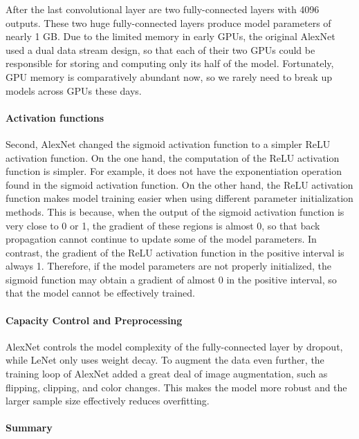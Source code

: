 After the last convolutional layer are two fully-connected layers with 4096 outputs. These two huge fully-connected layers produce model parameters of nearly 1 GB. Due to the limited memory in early GPUs, the original AlexNet used a dual data stream design,
so that each of their two GPUs could be responsible for storing and computing only its half of the model. Fortunately, GPU memory is comparatively abundant now, so we rarely need to break up models across GPUs these days.

\paragraph{Activation functions}

Second, AlexNet changed the sigmoid activation function to a simpler ReLU activation function. On the one hand, the computation of the ReLU activation function is simpler. For example, it does not have the exponentiation operation found in the sigmoid activation function. On the other hand, the ReLU activation function makes model training easier when using different parameter initialization methods. This is because, when the output of the sigmoid activation function is very close to 0 or 1, the gradient of these regions is almost 0, so that back propagation cannot continue to update some of the model parameters. In contrast, the gradient of the ReLU activation function in the positive interval is always 1. Therefore, if the model parameters are not properly initialized, the sigmoid function may obtain a gradient of almost 0 in the positive interval, so that the model cannot be effectively trained.

\paragraph{Capacity Control and Preprocessing}

AlexNet controls the model complexity of the fully-connected layer by dropout, while LeNet only uses weight decay. To augment the data even further, the training loop of AlexNet added a great deal of image augmentation, such as flipping, clipping, and color changes.
This makes the model more robust and the larger sample size effectively reduces overfitting.

\paragraph{Summary}

